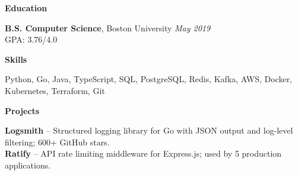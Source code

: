 \documentclass[11pt,a4paper]{article}
\begin{document}
\vspace{10pt}
\noindent\textbf{Education}
\vspace{3pt}

\noindent\textbf{B.S. Computer Science}, Boston University \hfill \textit{May 2019}\\
GPA: 3.76/4.0

\vspace{10pt}
\noindent\textbf{Skills}
\vspace{3pt}

\noindent Python, Go, Java, TypeScript, SQL, PostgreSQL, Redis, Kafka, AWS, Docker, Kubernetes, Terraform, Git

\vspace{10pt}
\noindent\textbf{Projects}
\vspace{3pt}

\noindent\textbf{Logsmith} -- Structured logging library for Go with JSON output and log-level filtering; 600+ GitHub stars.\\
\noindent\textbf{Ratify} -- API rate limiting middleware for Express.js; used by 5 production applications.
\end{document}
